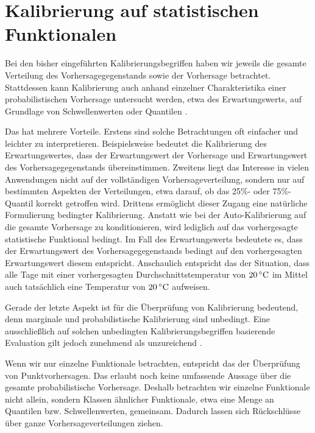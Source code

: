 \section{Kalibrierung auf statistischen Funktionalen} \label{seq:T_cal}
Bei den bisher eingeführten Kalibrierungsbegriffen haben wir jeweils die gesamte Verteilung des Vorhersagegegenstands sowie der Vorhersage betrachtet. Stattdessen kann Kalibrierung auch anhand einzelner Charakteristika einer probabilistischen Vorhersage untersucht werden, etwa des Erwartungswerts, auf Grundlage von Schwellenwerten oder Quantilen \parencite{gneiting2023regression, jordanOptimalSolutions2022}.

Das hat mehrere Vorteile. Erstens sind solche Betrachtungen oft einfacher und leichter zu interpretieren. Beispielsweise bedeutet die Kalibrierung des Erwartungswertes, dass der Erwartungswert der Vorhersage und Erwartungswert des Vorhersagegegenstands übereinstimmen. Zweitens liegt das Interesse in vielen Anwendungen nicht auf der voll\-ständigen Vorhersageverteilung, sondern nur auf bestimmten Aspekten der Verteilungen, etwa darauf, ob das 25\%- oder 75\%-Quantil korrekt getroffen wird. Drittens ermöglicht dieser Zugang eine natürliche Formulierung bedingter Kalibrierung. Anstatt wie bei der Auto-Kalibrierung auf die gesamte Vorhersage zu konditionieren, wird lediglich auf das vorhergesagte statistische Funktional bedingt. Im Fall des Erwartungswerts bedeutete es, dass der Erwartungswert des Vorhersagegegenstands bedingt auf den vorhergesagten Erwartungswert diesem entspricht. Anschaulich entspricht das der Situation, dass alle Tage mit einer vorhergesagten Durchschnittstemperatur von $20\,^\circ\mathrm{C}$ im Mittel auch tatsächlich eine Temperatur von $20\,^\circ\mathrm{C}$ aufweisen.

Gerade der letzte Aspekt ist für die Überprüfung von Kalibrierung bedeutend, denn marginale und probabilistische Kalibrierung sind unbedingt. Eine ausschließlich auf solchen unbedingten Kalibrierungsbegriffen basierende Evaluation gilt jedoch zunehmend als unzureichend  \parencite{gneiting2023regression}.

Wenn wir nur einzelne Funktionale betrachten, entspricht das der Überprüfung von Punktvorhersagen. Das erlaubt noch keine umfassende Aussage über die gesamte probabilistische Vorhersage. Deshalb betrachten wir einzelne Funktionale nicht allein, sondern Klassen ähnlicher Funktionale, etwa eine Menge an Quantilen bzw. Schwellenwerten, gemeinsam. Dadurch lassen sich Rückschlüsse über ganze Vorhersageverteilungen ziehen.

